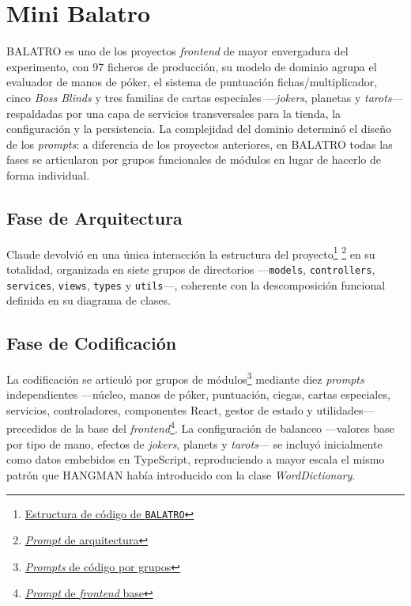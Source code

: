 \section{Mini Balatro} \label{sec:dev-balatro}

\ac{BALATRO} es uno de los proyectos \textit{frontend} de mayor envergadura del experimento, con 97 ficheros de producción, su modelo de dominio agrupa el evaluador de manos de póker, el sistema de puntuación fichas/multiplicador, cinco \textit{Boss Blinds} y tres familias de cartas especiales ---\textit{jokers}, planetas y \textit{tarots}--- respaldadas por una capa de servicios transversales para la tienda, la configuración y la persistencia. La complejidad del dominio determinó el diseño de los \textit{prompts}: a diferencia de los proyectos anteriores, en \ac{BALATRO} todas las fases se articularon por grupos funcionales de módulos en lugar de hacerlo de forma individual.

\subsection{Fase de Arquitectura}

Claude devolvió en una única interacción la estructura del proyecto\footnote{\href{https://github.com/alu0101549491/TFG-Fabian-Gonzalez-Lence/blob/main/resources/project-structures/3-MiniBalatro.md}{Estructura de código de \texttt{BALATRO}}} \footnote{\href{https://github.com/alu0101549491/TFG-Fabian-Gonzalez-Lence/blob/main/resources/prompts/3-MiniBalatro/1-Inicializacion/architecture.prompt.md}{\textit{Prompt} de arquitectura}} en su totalidad, organizada en siete grupos de directorios ---\texttt{models}, \texttt{controllers}, \texttt{services}, \texttt{views}, \texttt{types} y \texttt{utils}---, coherente con la descomposición funcional definida en su diagrama de clases.

\subsection{Fase de Codificación}

La codificación se articuló por grupos de módulos\footnote{\href{https://github.com/alu0101549491/TFG-Fabian-Gonzalez-Lence/tree/main/resources/prompts/3-MiniBalatro/3-CodigoPorGrupodeModulos}{\textit{Prompts} de código por grupos}} mediante diez \textit{prompts} independientes ---núcleo, manos de póker, puntuación, ciegas, cartas especiales, servicios, controladores, componentes React, gestor de estado y utilidades--- precedidos de la base del \textit{frontend}\footnote{\href{https://github.com/alu0101549491/TFG-Fabian-Gonzalez-Lence/blob/main/resources/prompts/3-MiniBalatro/2-CodigoFrontend/frontend.prompt.md}{\textit{Prompt} de \textit{frontend} base}}. La configuración de balanceo ---valores base por tipo de mano, efectos de \textit{jokers}, planets y \textit{tarots}--- se incluyó inicialmente como datos embebidos en TypeScript, reproduciendo a mayor escala el mismo patrón que \ac{HANGMAN} había introducido con la clase \textit{WordDictionary}.

